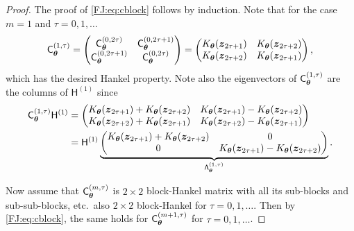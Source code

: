 \documentclass[graybox,footinfo]{svmult}
\begin{document}
\begin{proof}
    The proof of \eqref{FJ:eq:cblock} follows by induction.  Note that for the case $m=1$ and $\tau = 0, 1, \ldots$
    \begin{equation*}
        \mathsf{C}_{{\boldsymbol{\theta}}}^{(1,\tau)} 
        = \begin{pmatrix} \mathsf{C}_{{\boldsymbol{\theta}}}^{(0, 2\tau)} & \mathsf{C}_{{\boldsymbol{\theta}}}^{(0,2 \tau+1)} \\
        	\mathsf{C}_{{\boldsymbol{\theta}}}^{(0,2 \tau+1)} & \mathsf{C}_{{\boldsymbol{\theta}}}^{(0,2 \tau)}
        \end{pmatrix}
        =  \begin{pmatrix}
        K_{\boldsymbol{\theta}}({\boldsymbol{z}}_{2 \tau+1}) & K_{\boldsymbol{\theta}}({\boldsymbol{z}}_{2 \tau+2}) \\
        K_{\boldsymbol{\theta}}({\boldsymbol{z}}_{2 \tau+2}) & K_{\boldsymbol{\theta}}({\boldsymbol{z}}_{2 \tau+1}) 
        \end{pmatrix} ,
    \end{equation*}
   which has the desired Hankel property. Note also the eigenvectors of $\mathsf{C}_{{\boldsymbol{\theta}}}^{(1,\tau)}$ are the columns of $\mathsf{H}^{(1)}$ since   
   \begin{align*}
        \mathsf{C}_{{\boldsymbol{\theta}}}^{(1,\tau)} \mathsf{H}^{(1)} & =  \begin{pmatrix}
        K_{\boldsymbol{\theta}}({\boldsymbol{z}}_{2 \tau+1}) + K_{\boldsymbol{\theta}}({\boldsymbol{z}}_{2 \tau+2}) & K_{\boldsymbol{\theta}}({\boldsymbol{z}}_{2 \tau+1}) - K_{\boldsymbol{\theta}}({\boldsymbol{z}}_{2 \tau+2})\\
        K_{\boldsymbol{\theta}}({\boldsymbol{z}}_{2 \tau+2}) + K_{\boldsymbol{\theta}}({\boldsymbol{z}}_{2 \tau+1}) &  K_{\boldsymbol{\theta}}({\boldsymbol{z}}_{2 \tau+2}) - K_{\boldsymbol{\theta}}({\boldsymbol{z}}_{2 \tau+1}) 
        \end{pmatrix} \\
        & = \mathsf{H}^{(1)} \underbrace{\begin{pmatrix}
        K_{\boldsymbol{\theta}}({\boldsymbol{z}}_{2 \tau+1}) + K_{\boldsymbol{\theta}}({\boldsymbol{z}}_{2 \tau+2}) & 0\\
        0 &   K_{\boldsymbol{\theta}}({\boldsymbol{z}}_{2 \tau+1}) - K_{\boldsymbol{\theta}}({\boldsymbol{z}}_{2 \tau+2})
        \end{pmatrix}}_{\mathsf{\Lambda}_{{\boldsymbol{\theta}}}^{(1,\tau)}} .
    \end{align*}

   Now assume that $\mathsf{C}_{{\boldsymbol{\theta}}}^{(m,\tau)}$ is $2\times 2$ block-Hankel matrix with all its sub-blocks and sub-sub-blocks, etc.\ also $2\times 2$ block-Hankel for $\tau = 0, 1, \ldots$.  Then by \eqref{FJ:eq:cblock}, the same holds for $\mathsf{C}_{{\boldsymbol{\theta}}}^{(m+1,\tau)}$ for $\tau = 0, 1, \ldots$. 
   

\end{proof}
\end{document}
